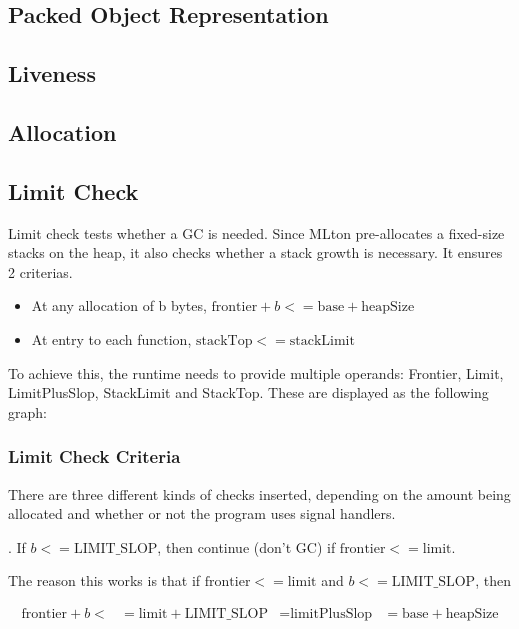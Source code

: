 \subsection{Packed Object Representation}

\subsection{Liveness}

\subsection{Allocation}

\subsection{Limit Check}
Limit check tests whether a GC is needed. Since MLton pre-allocates a
fixed-size stacks on the heap, it also checks whether a stack growth
is necessary. It ensures 2 criterias.

\begin{itemize}
\item At any allocation of b bytes, $\mbox{frontier} + b <=
  \mbox{base} + \mbox{heapSize}$
\item At entry to each function, $\mbox{stackTop} <=
  \mbox{stackLimit}$
\end{itemize}

To achieve this, the runtime needs to provide multiple operands: Frontier,
Limit, LimitPlusSlop, StackLimit and StackTop. These are displayed as
the following graph:


\subsubsection{Limit Check Criteria}
There are three different kinds of checks inserted, depending on the
amount being allocated and whether or not the program uses signal
handlers.

. If $b <= \mbox{LIMIT_SLOP}$, then continue (don't GC) if
$\mbox{frontier} <= \mbox{limit}$.

The reason this works is that if $\mbox{frontier} <= \mbox{limit}$ and
$b <= \mbox{LIMIT_SLOP}$, then

\begin{align}
  \mbox{frontier} + b <&= \mbox{limit} + \mbox{LIMIT_SLOP}
                       &= \mbox{limitPlusSlop}
                       &= \mbox{base} + \mbox{heapSize}
\end{align}

